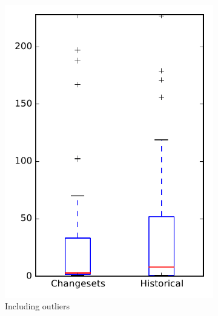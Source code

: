 
\begin{figure}
    \centering
    \begin{subfigure}{.4\textwidth}
        \centering
        \includegraphics[height=0.4\textheight]{figures/flt/rq2_tika}
        \caption{Including outliers}\label{fig:flt:rq2:tika_outlier}
    \end{subfigure}%
    \begin{subfigure}{.4\textwidth}
        \centering

\end{subfigure}
\end{figure}

